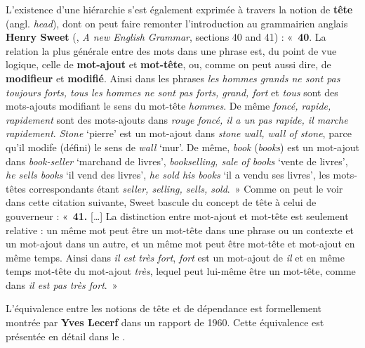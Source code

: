 {    L’existence d’une hiérarchie s’est également exprimée à travers la notion de \textbf{tête} (angl. \textit{head}), dont on peut faire remonter l’introduction au grammairien anglais \textbf{Henry Sweet} (\citeyear{Sweet1891}, \textit{A new English Grammar}, sections 40 and 41) : «~\textbf{40}. La relation la plus générale entre des mots dans une phrase est, du point de vue logique, celle de \textbf{mot-ajout} et \textbf{mot-tête}, ou, comme on peut aussi dire, de \textbf{modifieur} et \textbf{modifié}. Ainsi dans les phrases \textit{les hommes grands ne sont pas toujours forts, tous les hommes ne sont pas forts, grand, fort} et \textit{tous} sont des mots-ajouts modifiant le sens du mot-tête \textit{hommes}. De même \textit{foncé, rapide, rapidement} sont des mots-ajouts dans \textit{rouge foncé, il a un pas rapide, il marche rapidement}. \textit{Stone} ‘pierre’ est un mot-ajout dans \textit{stone wall, wall of stone}, parce qu’il modife (défini) le sens de \textit{wall} ‘mur’. De même, \textit{book} (\textit{books}) est un mot-ajout dans \textit{book-seller} ‘marchand de livres’, \textit{bookselling, sale of books} ‘vente de livres’, \textit{he sells books} ‘il vend des livres’, \textit{he sold his books} ‘il a vendu ses livres’, les mots-têtes correspondants étant \textit{seller, selling, sells, sold}.~» Comme on peut le voir dans cette citation suivante, Sweet bascule du concept de tête à celui de gouverneur : «~\textbf{41.} […] La distinction entre mot-ajout et mot-tête est seulement relative : un même mot peut être un mot-tête dans une phrase ou un contexte et un mot-ajout dans un autre, et un même mot peut être mot-tête et mot-ajout en même temps. Ainsi dans \textit{il est très fort}, \textit{fort} est un mot-ajout de \textit{il} et en même temps mot-tête du mot-ajout \textit{très}, lequel peut lui-même être un mot-tête, comme dans \textit{il est pas très fort}.~»

    L’équivalence entre les notions de tête et de dépendance est formellement montrée par \textbf{Yves Lecerf} dans un rapport de 1960. Cette équivalence est présentée en détail dans le .

}

